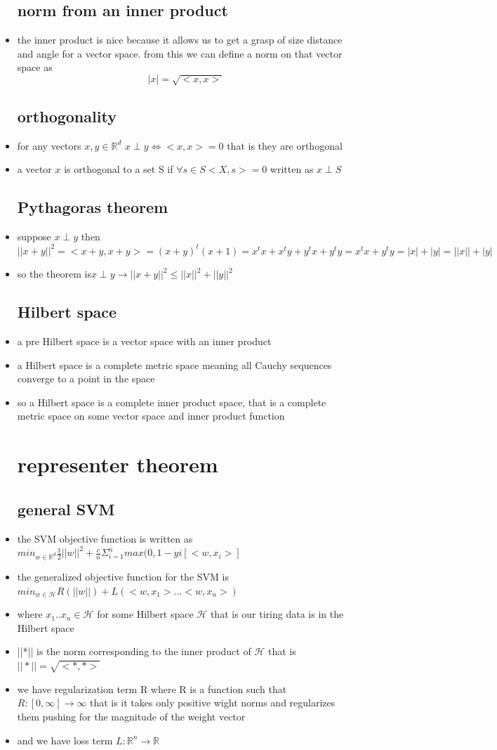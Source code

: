 \documentclass{article}
\begin{document}
\begin{itemize}
\subsection{norm from an inner product}
\item the inner product is nice because it allows us to get a grasp of size distance and angle for a vector space. from this we can define a norm on that vector space as $$|x|=\sqrt{<x,x>}$$
\subsection{orthogonality}
\item for any vectors $x,y\in\mathbb{R}^{d} $ $x\perp y\iff <x,x>=0$ that is they are orthogonal 
\item a vector $x$ is orthogonal to a set S if $\forall s\in S <X,s>=0$ written as $x\perp S$
\subsection{Pythagoras theorem}
\item suppose $x\perp y$ then $||x+y||^2=<x+y,x+y>=(x+y)^{t}(x+1)=x^tx+x^ty+y^tx+y^ty={x^tx+y^ty}=|x|+|y|=||x||+|y|$
\item so the theorem is$x\perp y\rightarrow ||x+y||^{2}\leq ||x||^{2}+||y||^2$
\subsection{Hilbert space }
\item a pre Hilbert space is a vector space with an inner product 
\item a Hilbert space is a complete metric space meaning all Cauchy sequences converge to a point in the space
\item so a Hilbert space is a complete inner product space, that is a complete metric space on some vector space and inner product function
\section{representer theorem}
\subsection{general SVM}
\item the SVM objective function is written as $min_{w\in \mathbb{R}^{d}}\frac{1}{2}||w||^2+\frac{c}{n}\Sigma_{i=1}^{n}max(0,1-yi[<w,x_i>]$
\item the generalized objective function for the SVM is $min_{w\in \mathcal{H}}R(||w||)+L(<w,x_1>...<w,x_n>)$ 
\item where $x_1..x_n\in \mathcal{H}$ for some Hilbert space $\mathcal{H}$  that is our tiring data is in the Hilbert space
\item ||*|| is the norm corresponding to the inner product of $\mathcal{H} $ that is $||*||=\sqrt{<*,*>}$
\item we have regularization term R where R is a function such that $R:[0,\infty]\rightarrow \infty$ that is it takes only positive wight norms and regularizes them pushing for the magnitude of the weight vector
\item and we have loss term  $L:\mathbb{R}^{n}\rightarrow \mathbb{R}$

\end{itemize}
\end{document}
